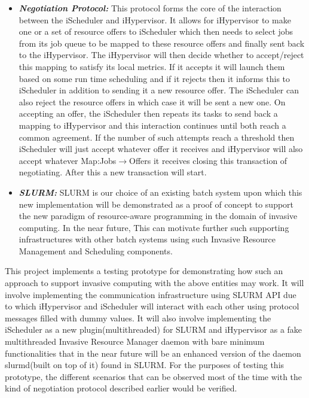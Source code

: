 \begin{itemize}
\item \textbf{\textit{Negotiation Protocol:}} This protocol forms the core of the interaction between the iScheduler and iHypervisor. It allows for iHypervisor to make one or a set of resource offers to iScheduler which then needs to select jobs from its job queue to be mapped to these resource offers and finally sent back to the iHypervisor. The iHypervisor will then decide whether to accept/reject this mapping to satisfy its local metrics. If it accepts it will launch them based on some run time scheduling and if it rejects then it informs this to iScheduler in addition to sending it a new resource offer. The iScheduler can also reject the resource offers in which case it will be sent a new one. On accepting an offer, the iScheduler then repeats its tasks to send back a mapping to iHypervisor and this interaction continues until both reach a common agreement. If the number of such attempts reach a threshold then iScheduler will just accept whatever offer it receives and iHypervisor will also accept whatever Map:Jobs$\rightarrow$Offers it receives closing this transaction of negotiating. After this a new transaction will start.
\item \textbf{\textit{SLURM:}} SLURM is our choice of an existing batch system upon which this new implementation will be demonstrated as a proof of concept to support the new paradigm of resource-aware programming in the domain of invasive computing. In the near future, This can motivate further such supporting infrastructures with other batch systems using such Invasive Resource Management and Scheduling components.
\end{itemize}
\noindent
This project implements a testing prototype for demonstrating how such an approach to support invasive computing with the above entities may work. It will involve implementing the communication infrastructure using SLURM API due to which iHypervisor and iScheduler will interact with each other using protocol messages filled with dummy values. It will also involve implementing the iScheduler as a new plugin(multithreaded) for SLURM and iHypervisor as a fake multithreaded Invasive Resource Manager daemon with bare minimum functionalities that in the near future will be an enhanced version of the daemon slurmd(built on top of it) found in SLURM. For the purposes of testing this prototype, the different scenarios that can be observed most of the time with the kind of negotiation protocol described earlier would be verified.
